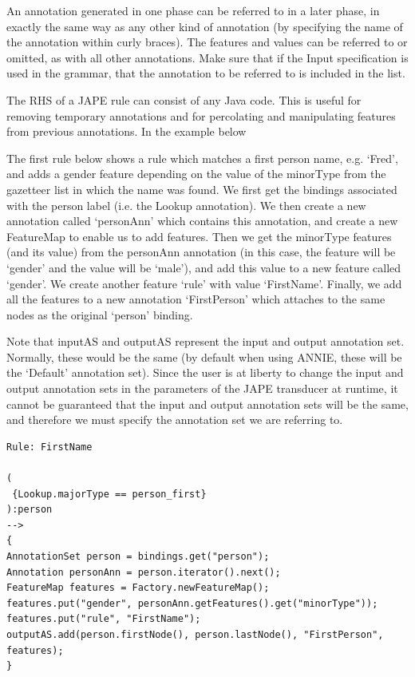 An annotation generated in one phase can be referred to in a later phase, in
exactly the same way as any other kind of annotation (by specifying the name of
the annotation within curly braces). The features and values can be referred to
or omitted, as with all other annotations. Make sure that if the Input
specification is used in the grammar, that the annotation to be referred to is
included in the list.

The RHS of a JAPE rule can consist of any Java code.
This is useful for removing temporary annotations and for percolating
and manipulating features from previous annotations. In the example below

The first rule below shows a rule which matches a first person name,
e.g. `Fred', and adds a gender feature depending on the value of the
minorType from the gazetteer list in which the name was found.
We first get the bindings associated with the person label (i.e. the
Lookup annotation). We then create a new annotation called
`personAnn' which contains this annotation, and create a new
FeatureMap to enable us to add features. Then we get the minorType
features (and its value) from the personAnn annotation (in this case,
the feature will be `gender' and the value will be `male'), and
add this value to a new feature called `gender'. We create another
feature `rule' with value `FirstName'. Finally, we add all the
features to a new annotation `FirstPerson' which attaches to the
same nodes as the original `person' binding.

Note that inputAS and outputAS represent the input and output
annotation set. Normally, these would be the same (by default when
using ANNIE, these will be the `Default' annotation set). Since the
user is at liberty to change the input and output annotation sets in
the parameters of the JAPE transducer at runtime, it cannot be
guaranteed that the input and output annotation sets will be the same,
and therefore we must specify the annotation set we are referring to.


\begin{small}
\begin{verbatim}
Rule: FirstName

(
 {Lookup.majorType == person_first}
):person
-->
{
AnnotationSet person = bindings.get("person");
Annotation personAnn = person.iterator().next();
FeatureMap features = Factory.newFeatureMap();
features.put("gender", personAnn.getFeatures().get("minorType"));
features.put("rule", "FirstName");
outputAS.add(person.firstNode(), person.lastNode(), "FirstPerson",
features);
}
\end{verbatim}
\end{small}

